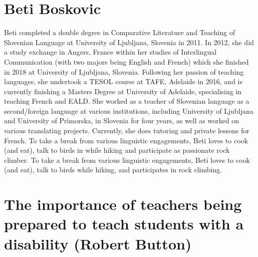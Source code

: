\documentclass[twoside,14pt,a4paper,notitlepage]{memoir}
\begin{document}
\section*{Beti Boskovic}

Beti completed a double degree in Comparative Literature and Teaching of Slovenian Language at University of Ljubljana, Slovenia in 2011. In 2012, she did a study exchange in Angers, France within her studies of Interlingual Communication (with two majors being English and French) which she finished in 2018 at University of Ljubljana, Slovenia. Following her passion of teaching languages, she undertook a TESOL course at TAFE, Adelaide in 2016, and is currently finishing a Masters Degree at University of Adelaide, specialising in teaching French and EALD.
She worked as a teacher of Slovenian language as a second/foreign language at various institutions, including University of Ljubljana and University of Primorska, in Slovenia for four years, as well as worked on various translating projects. Currently, she does tutoring and private lessons for French.
To take a break from various linguistic engagements, Beti loves to cook (and eat), talk to birds in while hiking and participate as passionate rock climber.
To take a break from various linguistic engagements, Beti loves to cook (and eat), talk to birds while hiking, and participates in rock climbing.



\section*{The importance of teachers being prepared to teach students with a disability
 (Robert Button)}
\label{aut:button}
\end{document}
